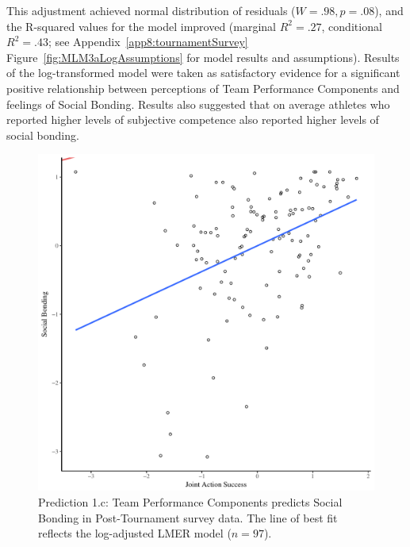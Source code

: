 \begin{CJK}{UTF8}{gbsn}
This adjustment achieved normal distribution of residuals ($W = .98, p = .08$), and the R-squared values for the model improved (marginal $R^2 = .27$, conditional $R^2 = .43$; see Appendix~\ref{app8:tournamentSurvey} Figure~\ref{fig:MLM3aLogAssumptions} for model results and assumptions).  Results of the log-transformed model were taken as satisfactory evidence for a significant positive relationship between perceptions of Team Performance Components and feelings of Social Bonding.  Results also suggested that on average athletes who reported higher levels of subjective competence also reported higher levels of social bonding.


  \begin{figure}[htbp]
    \centering
  \includegraphics[scale=.5]{images/jasBondModelSlope.pdf}
    \caption{Prediction 1.c: Team Performance Components predicts Social Bonding in Post-Tournament survey data. The line of best fit reflects the log-adjusted LMER model ($n = 97$).}
    \label{fig:jasBondModelSlope}
  \end{figure}



\end{CJK}
